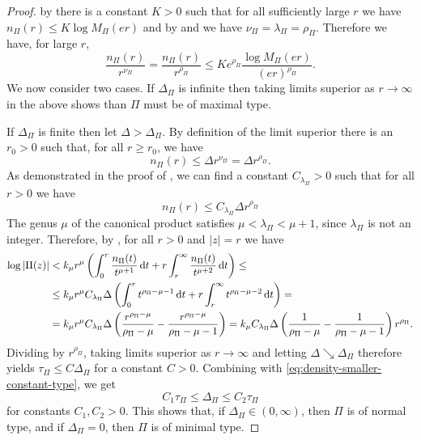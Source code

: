 \begin{proof}
    by  there is a constant $K > 0$ such that for all sufficiently large $r$ we have $n_\Pi(r) \leq K \log M_\Pi(er)$ and by  and  we have $\nu_\Pi = \lambda_\Pi = \rho_\Pi$. Therefore we have, for large $r$,
    \begin{equation} \label{eq:density-smaller-constant-type}
        \frac{n_\Pi(r)}{r^{\nu_\Pi}} = \frac{n_\Pi(r)}{r^{\rho_\Pi}} \leq K e^{\rho_\Pi} \frac{\log M_\Pi(er)}{(e r)^{\rho_\Pi}}.
    \end{equation}
    We now consider two cases. If $\Delta_\Pi$ is infinite then taking limits superior as $r \to \infty$ in the above shows than $\Pi$ must be of maximal type.

    If $\Delta_\Pi$ is finite then let $\Delta > \Delta_\Pi$. By definition of the limit superior there is an $r_0 > 0$ such that, for all $r \geq r_0$, we have
    \begin{equation*}
        n_\Pi(r) \leq \Delta r^{\nu_\Pi} = \Delta r^{\rho_\Pi}. 
    \end{equation*}
    As demonstrated in the proof of , we can find a constant $C_{\lambda_\Pi} > 0$ such that for all $r > 0$ we have
    \begin{equation*}
        n_\Pi(r) \leq C_{\lambda_\Pi} \Delta r^{\rho_\Pi}
    \end{equation*}
    The genus $\mu$ of the canonical product satisfies $\mu < \lambda_\Pi < \mu + 1$, since $\lambda_\Pi$ is not an integer. Therefore, by , for all $r > 0$ and $\vert z \vert = r$ we have
    \begin{align*}
        \log \vert \Pi(z) \vert &< k_\mu r^\mu \left( \int_0^r \frac{n_\Pi(t)}{t^{\mu + 1}} \mathop{}\!\mathrm{d} t + r \int_r^\infty \frac{n_\Pi(t)}{t^{\mu + 2}} \mathop{}\!\mathrm{d} t \right) \leq \\
        &\leq k_\mu r^\mu C_{\lambda_\Pi} \Delta \left( \int_0^r t^{\rho_\Pi - \mu - 1} \mathop{}\!\mathrm{d} t + r \int_r^\infty t^{\rho_\Pi - \mu - 2} \mathop{}\!\mathrm{d} t \right) = \\
        &= k_\mu r^\mu C_{\lambda_\Pi} \Delta \left( \frac{r^{\rho_\Pi - \mu}}{\rho_\Pi - \mu} - \frac{r^{\rho_\Pi - \mu}}{\rho_\Pi - \mu - 1} \right) = k_\mu C_{\lambda_\Pi} \Delta \left( \frac{1}{\rho_\Pi - \mu} - \frac{1}{\rho_\Pi - \mu - 1} \right) r^{\rho_\Pi}.
    \end{align*}
    Dividing by $r^{\rho_\Pi}$, taking limits superior as $r \to \infty$ and letting $\Delta \searrow \Delta_\Pi$ therefore yields $\tau_\Pi \leq C \Delta_\Pi$ for a constant $C > 0$. Combining with \eqref{eq:density-smaller-constant-type}, we get
    \begin{equation*}
        C_1 \tau_\Pi \leq \Delta_\Pi \leq C_2 \tau_\Pi
    \end{equation*}
    for constants $C_1, C_2 > 0$. This shows that, if $\Delta_\Pi \in (0, \infty)$, then $\Pi$ is of normal type, and if $\Delta_\Pi = 0$, then $\Pi$ is of minimal type.
\end{proof}


